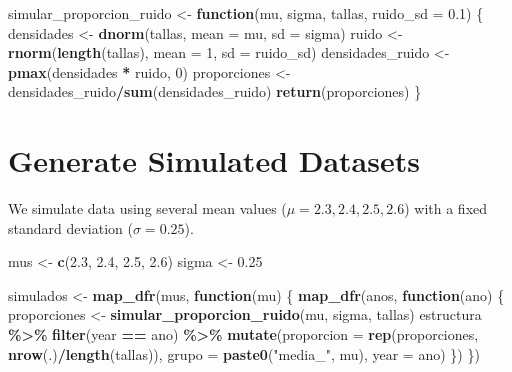 \documentclass[
]{article}
\newenvironment{Shaded}{\begin{snugshade}}{\end{snugshade}}
\newcommand{\AttributeTok}[1]{\textcolor[rgb]{0.13,0.29,0.53}{#1}}
\newcommand{\ControlFlowTok}[1]{\textcolor[rgb]{0.13,0.29,0.53}{\textbf{#1}}}
\newcommand{\DecValTok}[1]{\textcolor[rgb]{0.00,0.00,0.81}{#1}}
\newcommand{\FloatTok}[1]{\textcolor[rgb]{0.00,0.00,0.81}{#1}}
\newcommand{\FunctionTok}[1]{\textcolor[rgb]{0.13,0.29,0.53}{\textbf{#1}}}
\newcommand{\NormalTok}[1]{#1}
\newcommand{\OtherTok}[1]{\textcolor[rgb]{0.56,0.35,0.01}{#1}}
\newcommand{\SpecialCharTok}[1]{\textcolor[rgb]{0.81,0.36,0.00}{\textbf{#1}}}
\newcommand{\StringTok}[1]{\textcolor[rgb]{0.31,0.60,0.02}{#1}}
\begin{document}
\begin{Shaded}
\begin{Highlighting}[]
\NormalTok{simular\_proporcion\_ruido }\OtherTok{\textless{}{-}} \ControlFlowTok{function}\NormalTok{(mu, sigma, tallas,}
    \AttributeTok{ruido\_sd =} \FloatTok{0.1}\NormalTok{) \{}
\NormalTok{    densidades }\OtherTok{\textless{}{-}} \FunctionTok{dnorm}\NormalTok{(tallas, }\AttributeTok{mean =}\NormalTok{ mu, }\AttributeTok{sd =}\NormalTok{ sigma)}
\NormalTok{    ruido }\OtherTok{\textless{}{-}} \FunctionTok{rnorm}\NormalTok{(}\FunctionTok{length}\NormalTok{(tallas), }\AttributeTok{mean =} \DecValTok{1}\NormalTok{, }\AttributeTok{sd =}\NormalTok{ ruido\_sd)}
\NormalTok{    densidades\_ruido }\OtherTok{\textless{}{-}} \FunctionTok{pmax}\NormalTok{(densidades }\SpecialCharTok{*}\NormalTok{ ruido, }\DecValTok{0}\NormalTok{)}
\NormalTok{    proporciones }\OtherTok{\textless{}{-}}\NormalTok{ densidades\_ruido}\SpecialCharTok{/}\FunctionTok{sum}\NormalTok{(densidades\_ruido)}
    \FunctionTok{return}\NormalTok{(proporciones)}
\NormalTok{\}}
\end{Highlighting}
\end{Shaded}

\section{Generate Simulated Datasets}\label{generate-simulated-datasets}

We simulate data using several mean values (\(\mu = 2.3, 2.4, 2.5, 2.6\)) with a fixed standard deviation (\(\sigma = 0.25\)).

\begin{Shaded}
\begin{Highlighting}[]
\NormalTok{mus }\OtherTok{\textless{}{-}} \FunctionTok{c}\NormalTok{(}\FloatTok{2.3}\NormalTok{, }\FloatTok{2.4}\NormalTok{, }\FloatTok{2.5}\NormalTok{, }\FloatTok{2.6}\NormalTok{)}
\NormalTok{sigma }\OtherTok{\textless{}{-}} \FloatTok{0.25}

\NormalTok{simulados }\OtherTok{\textless{}{-}} \FunctionTok{map\_dfr}\NormalTok{(mus, }\ControlFlowTok{function}\NormalTok{(mu) \{}
    \FunctionTok{map\_dfr}\NormalTok{(anos, }\ControlFlowTok{function}\NormalTok{(ano) \{}
\NormalTok{        proporciones }\OtherTok{\textless{}{-}} \FunctionTok{simular\_proporcion\_ruido}\NormalTok{(mu,}
\NormalTok{            sigma, tallas)}
\NormalTok{        estructura }\SpecialCharTok{\%\textgreater{}\%}
            \FunctionTok{filter}\NormalTok{(year }\SpecialCharTok{==}\NormalTok{ ano) }\SpecialCharTok{\%\textgreater{}\%}
            \FunctionTok{mutate}\NormalTok{(}\AttributeTok{proporcion =} \FunctionTok{rep}\NormalTok{(proporciones, }\FunctionTok{nrow}\NormalTok{(.)}\SpecialCharTok{/}\FunctionTok{length}\NormalTok{(tallas)),}
                \AttributeTok{grupo =} \FunctionTok{paste0}\NormalTok{(}\StringTok{"media\_"}\NormalTok{, mu), }\AttributeTok{year =}\NormalTok{ ano)}
\NormalTok{    \})}
\NormalTok{\})}
\end{Highlighting}
\end{Shaded}
\end{document}
